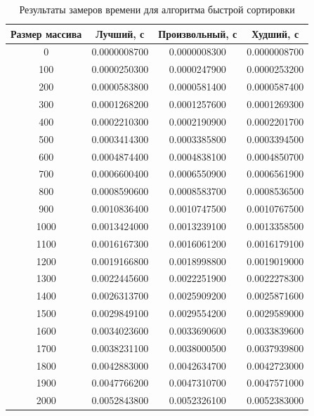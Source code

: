 \documentclass[a4paper,14pt]{report}
\begin{document}
\begin{table}[!h]
	\caption{Результаты замеров времени для алгоритма быстрой сортировки}
		\begin{tabular}{| c | c | c | c |}
	 	\hline
		Размер массива & Лучший, с & Произвольный, с & Худший, с \\ [0.5ex]
		\hline
		0 & 0.0000008700 & 0.0000008300 & 0.0000008700 \\
		\hline
		100 & 0.0000250300 & 0.0000247900 & 0.0000253200 \\
		\hline
		200 & 0.0000583800 & 0.0000581400 & 0.0000587400 \\
		\hline
		300 & 0.0001268200 & 0.0001257600 & 0.0001269300 \\
		\hline
		400 & 0.0002210300 & 0.0002190900 & 0.0002201700 \\
		\hline
		500 & 0.0003414300 & 0.0003385800 & 0.0003394500 \\
		\hline
		600 & 0.0004874400 & 0.0004838100 & 0.0004850700 \\
		\hline
		700 & 0.0006600400 & 0.0006550900 & 0.0006561900 \\
		\hline
		800 & 0.0008590600 & 0.0008583700 & 0.0008536500 \\
		\hline
		900 & 0.0010836400 & 0.0010747500 & 0.0010767500 \\
		\hline
		1000 & 0.0013424000 & 0.0013239100 & 0.0013358500 \\
		\hline
		1100 & 0.0016167300 & 0.0016061200 & 0.0016179100 \\
		\hline
		1200 & 0.0019166800 & 0.0018998800 & 0.0019019000 \\
		\hline
		1300 & 0.0022445600 & 0.0022251900 & 0.0022278300 \\
		\hline
		1400 & 0.0026313700 & 0.0025909200 & 0.0025871600 \\
		\hline
		1500 & 0.0029849100 & 0.0029554200 & 0.0029589000 \\
		\hline
		1600 & 0.0034023600 & 0.0033690600 & 0.0033839600 \\
		\hline
		1700 & 0.0038231100 & 0.0038000500 & 0.0037939800 \\
		\hline
		1800 & 0.0042883000 & 0.0042634700 & 0.0042723000 \\
		\hline
		1900 & 0.0047766200 & 0.0047310700 & 0.0047571000 \\
		\hline
		2000 & 0.0052843800 & 0.0052326100 & 0.0052383000 \\
		\hline
		\hline
		\end{tabular}
\end{table}
\end{document}
